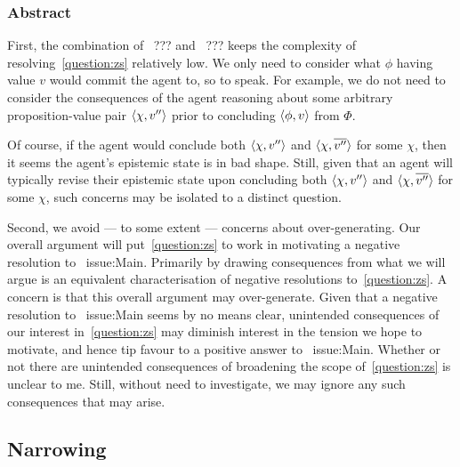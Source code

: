 \subsubsection{Abstract}

\begin{note}
  First, the combination of~{\color{red} ???} and~{\color{red} ???} keeps the complexity of resolving~\autoref{question:zs} relatively low.
  We only need to consider what \(\phi\) having value \(v\) would commit the agent to, so to speak.
  For example, we do not need to consider the consequences of the agent reasoning about some arbitrary proposition-value pair \(\langle \chi, v'' \rangle\) prior to concluding \(\langle \phi, v \rangle\) from \(\Phi\).

  Of course, if the agent would conclude both \(\langle \chi, v'' \rangle\) and \(\langle \chi, \overline{v''} \rangle\) for some \(\chi\), then it seems the agent's epistemic state is in bad shape.
  Still, given that an agent will typically revise their epistemic state upon concluding both \(\langle \chi, v'' \rangle\) and \(\langle \chi, \overline{v''} \rangle\) for some \(\chi\), such concerns may be isolated to a distinct question.

  Second, we avoid --- to some extent --- concerns about over-generating.
  Our overall argument will put~\autoref{question:zs} to work in motivating a negative resolution to~{\color{red} issue:Main}.
  Primarily by drawing consequences from what we will argue is an equivalent characterisation of negative resolutions to~\autoref{question:zs}.
  A concern is that this overall argument may over-generate.
  Given that a negative resolution to~{\color{red} issue:Main} seems by no means clear, unintended consequences of our interest in~\autoref{question:zs} may diminish interest in the tension we hope to motivate, and hence tip favour to a positive answer to~{\color{red} issue:Main}.
  Whether or not there are unintended consequences of broadening the scope of~\autoref{question:zs} is unclear to me.
  Still, without need to investigate, we may ignore any such consequences that may arise.
\end{note}

\subsection*{Narrowing }


